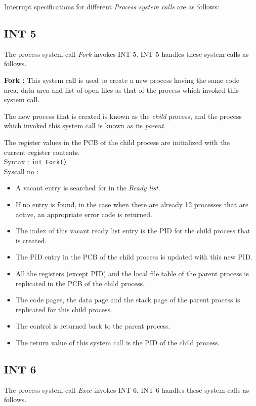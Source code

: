 \documentclass[10pt]{report}
\newcommand\counter[1]{\arabic{#1} \stepcounter{#1}}
\newcounter{syscall}
\begin{document}
\noindent Interrupt specifications for different \textit{Process system calls} are as follows:

\subsection{INT 5}
The process system call \textit{Fork} invokes INT 5. INT 5 handles these system calls as follows.

\textbf{Fork :}  This system call is used to create a new process having the same code area, data area and list of open files as that of the process which invoked this system call.

The new process that is created is known as the \emph{child} process, and the process which invoked this system call is known as its \emph{parent}.

The register values in the PCB of the child process are initialized with the current register contents.\\
Syntax : \texttt{int Fork()} \\
Syscall no : \counter{syscall}
\begin{itemize}
	\item A vacant entry is searched for in the \emph{Ready list}.
	\item If no entry is found, in the case when there are already 12 processes that are active, an appropriate error code is returned.
	\item The index of this vacant ready list entry is the PID for the child process that is created.
	\item The PID entry in the PCB of the child process is updated with this new PID.
	\item All the registers (except PID) and the local file table of the parent process is replicated in the PCB of the child process.
	\item The code pages, the data page and the stack page of the parent process is replicated for this child process.
	\item The control is returned back to the parent process.
	\item The return value of this system call is the PID of the child process.
\end{itemize}

\subsection{INT 6}
The process system call \textit{Exec} invokes INT 6. INT 6 handles these system calls as follows.
\end{document}
